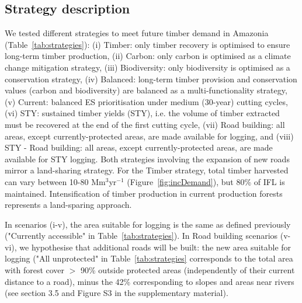 \documentclass{article}
\begin{document}
\subsection{Strategy description}

We tested different strategies to meet future timber demand in Amazonia (Table~\ref{tab:strategies}): (i) Timber: only timber recovery is optimised to ensure long-term timber production, (ii) Carbon: only carbon is optimised as a climate change mitigation strategy, (iii) Biodiversity: only biodiversity is optimised as a conservation strategy, (iv) Balanced: long-term timber provision and conservation values (carbon and biodiversity) are balanced as a multi-functionality strategy, (v) Current: balanced ES prioritisation under medium (30-year) cutting cycles, (vi) STY: sustained timber yields (STY), i.e. the volume of timber extracted must be recovered at the end of the first cutting cycle, (vii) Road building: all areas, except currently-protected areas, are made available for logging, and (viii) STY - Road building: all areas, except currently-protected areas, are made available for STY logging. Both strategies involving the expansion of new roads mirror a land-sharing strategy. For the Timber strategy, total timber harvested can vary between 10-80 Mm$^3$yr$^{-1}$ (Figure~\ref{fig:incDemand}), but 80\% of IFL is maintained. Intensification of timber production in current production forests represents a land-sparing approach.

In scenarios (i-v), the area suitable for logging is the same as defined previously ("Currently accessible" in Table~\ref{tab:strategies}). In Road building scenarios (v-vi), we hypothesise that additional roads will be built: the new area suitable for logging ("All unprotected" in Table~\ref{tab:strategies} corresponds to the total area with forest cover $>$ 90\% outside protected areas (independently of their current distance to a road), minus the 42\% corresponding to slopes and areas near rivers (see section 3.5 and Figure S3 in the supplementary material). 
\end{document}
